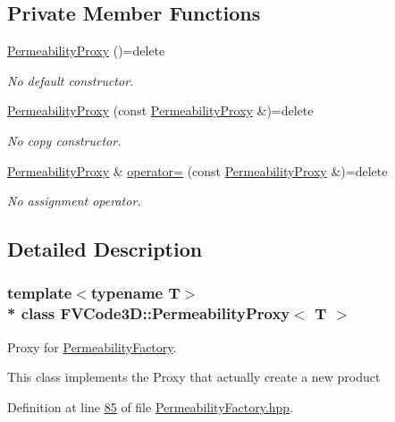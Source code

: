 \subsection*{Private Member Functions}
\begin{DoxyCompactItemize}
\item 
\hyperlink{classFVCode3D_1_1PermeabilityProxy_aa69972af9cb50c927f4238edd41b0ba5}{Permeability\+Proxy} ()=delete
\begin{DoxyCompactList}\small\item\em No default constructor. \end{DoxyCompactList}\item 
\hyperlink{classFVCode3D_1_1PermeabilityProxy_a9d4fdefdbe1ae5281f1f399f73ccdd16}{Permeability\+Proxy} (const \hyperlink{classFVCode3D_1_1PermeabilityProxy}{Permeability\+Proxy} \&)=delete
\begin{DoxyCompactList}\small\item\em No copy constructor. \end{DoxyCompactList}\item 
\hyperlink{classFVCode3D_1_1PermeabilityProxy}{Permeability\+Proxy} \& \hyperlink{classFVCode3D_1_1PermeabilityProxy_aa7f2cf12ee0f1f46e08bd5eb3552d967}{operator=} (const \hyperlink{classFVCode3D_1_1PermeabilityProxy}{Permeability\+Proxy} \&)=delete
\begin{DoxyCompactList}\small\item\em No assignment operator. \end{DoxyCompactList}\end{DoxyCompactItemize}


\subsection{Detailed Description}
\subsubsection*{template$<$typename T$>$\\*
class F\+V\+Code3\+D\+::\+Permeability\+Proxy$<$ T $>$}

Proxy for \hyperlink{classFVCode3D_1_1PermeabilityFactory}{Permeability\+Factory}. 

This class implements the Proxy that actually create a new product 

Definition at line \hyperlink{PermeabilityFactory_8hpp_source_l00085}{85} of file \hyperlink{PermeabilityFactory_8hpp_source}{Permeability\+Factory.\+hpp}.



